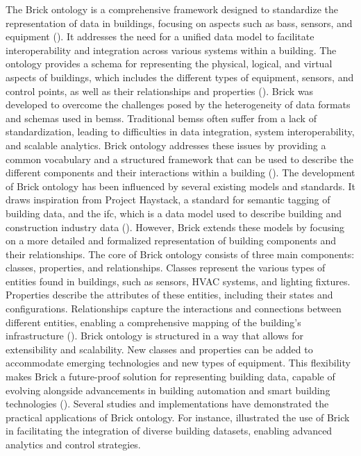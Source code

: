 The Brick ontology is a comprehensive framework designed to standardize the representation of data in buildings, focusing on aspects such as \glspl{bas}, sensors, and equipment (\cite{Balaji2016}).
It addresses the need for a unified data model to facilitate interoperability and integration across various systems within a building.
The ontology provides a schema for representing the physical, logical, and virtual aspects of buildings, which includes the different types of equipment, sensors, and control points, as well as their relationships and properties (\cite{Balaji2018}).
Brick was developed to overcome the challenges posed by the heterogeneity of data formats and schemas used in \glspl{bems}. Traditional \glspl{bems} often suffer from a lack of standardization, leading to difficulties in data integration, system interoperability, and scalable analytics.
Brick ontology addresses these issues by providing a common vocabulary and a structured framework that can be used to describe the different components and their interactions within a building (\cite{Balaji2018}).
The development of Brick ontology has been influenced by several existing models and standards.
It draws inspiration from Project Haystack, a standard for semantic tagging of building data, and the \gls{ifc}, which is a data model used to describe building and construction industry data (\cite{Balaji2016}).
However, Brick extends these models by focusing on a more detailed and formalized representation of building components and their relationships.
The core of Brick ontology consists of three main components: classes, properties, and relationships.
Classes represent the various types of entities found in buildings, such as sensors, HVAC systems, and lighting fixtures.
Properties describe the attributes of these entities, including their states and configurations.
Relationships capture the interactions and connections between different entities, enabling a comprehensive mapping of the building's infrastructure (\cite{Balaji2018}).
Brick ontology is structured in a way that allows for extensibility and scalability.
New classes and properties can be added to accommodate emerging technologies and new types of equipment.
This flexibility makes Brick a future-proof solution for representing building data, capable of evolving alongside advancements in building automation and smart building technologies (\cite{Balaji2016}).
Several studies and implementations have demonstrated the practical applications of Brick ontology.
For instance, \cite{Balaji2016} illustrated the use of Brick in facilitating the integration of diverse building datasets, enabling advanced analytics and control strategies.
